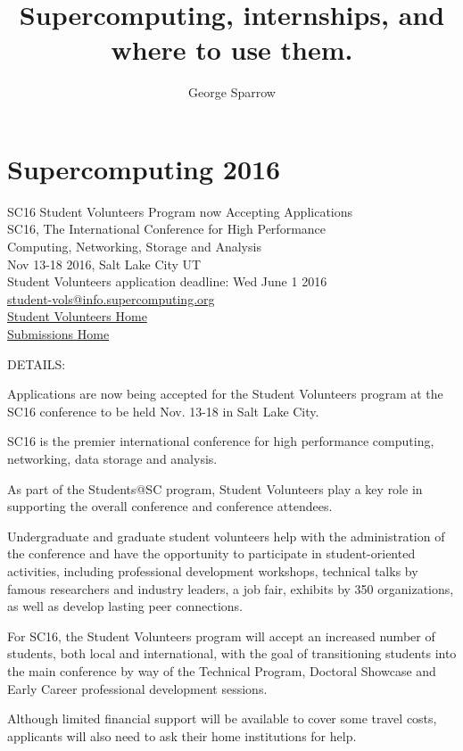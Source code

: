 \documentclass{article}
\title{Supercomputing, internships, and where to use them.}
\date{\mydate}
\author{George Sparrow}
\begin{document}
\maketitle
\newpage

\section{Supercomputing 2016}

SC16 Student Volunteers Program now Accepting Applications\\
SC16, The International Conference for High Performance\\
Computing, Networking, Storage and Analysis\\
Nov 13-18 2016, Salt Lake City UT\\
Student Volunteers application deadline: Wed June 1 2016\\
\href{mailto:student-vols@info.supercomputing.org}{student-vols@info.supercomputing.org}\\
\href{http://sc16.supercomputing.org/studentssc/student-volunteers/}{Student Volunteers Home}\\
\href{https://submissions.supercomputing.org/}{Submissions Home}

DETAILS:

Applications are now being accepted for the Student Volunteers program at the SC16 conference to be held Nov. 13-18 in Salt Lake City.

SC16 is the premier international conference for high performance computing, networking, data storage and analysis.

As part of the Students@SC program, Student Volunteers play a key role in supporting the overall conference and conference attendees.

Undergraduate and graduate student volunteers help with the administration of the conference and have the opportunity to participate in student-oriented activities, including professional development workshops, technical talks by famous researchers and industry leaders, a job fair, exhibits by 350 organizations, as well as develop lasting peer connections.

For SC16, the Student Volunteers program will accept an increased number of students, both local and international, with the goal of transitioning students into the main conference by way of the Technical Program, Doctoral Showcase and Early Career professional development sessions.

Although limited financial support will be available to cover some travel costs, applicants will also need to ask their home institutions for help.
\end{document}
